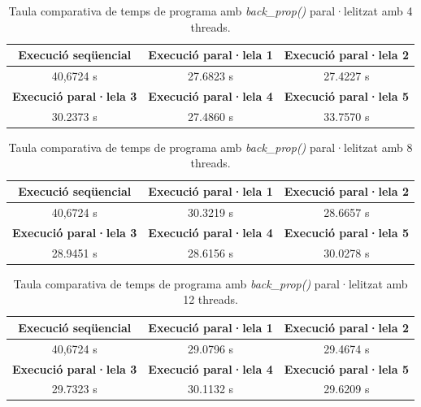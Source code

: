 \documentclass{article}
\begin{document}
\begin{table}[H]
    \centering
    \begin{tabular}{|c|c|c|}
        \hline
        \textbf{Execució seqüencial} & \textbf{Execució paral·lela 1} & \textbf{Execució paral·lela 2} \\ \hline
        40,6724 s & 27.6823 s & 27.4227 s \\ \hline
        \textbf{Execució paral·lela 3} & \textbf{Execució paral·lela 4} & \textbf{Execució paral·lela 5} \\ \hline
        30.2373 s & 27.4860 s & 33.7570 s \\ \hline
    \end{tabular}
    \caption{Taula comparativa de temps de programa amb  \textit{back\_prop()} paral·lelitzat amb 4 threads.}
    \label{tab:f5_4trheads}
\end{table}

\begin{table}[H]
    \centering
    \begin{tabular}{|c|c|c|}
        \hline
        \textbf{Execució seqüencial} & \textbf{Execució paral·lela 1} & \textbf{Execució paral·lela 2} \\ \hline
        40,6724 s & 30.3219 s & 28.6657 s \\ \hline
        \textbf{Execució paral·lela 3} & \textbf{Execució paral·lela 4} & \textbf{Execució paral·lela 5} \\ \hline
        28.9451 s & 28.6156 s & 30.0278 s \\ \hline
    \end{tabular}
    \caption{Taula comparativa de temps de programa amb \textit{back\_prop()} paral·lelitzat amb 8 threads.}
    \label{tab:f5_8trheads}
\end{table}

\begin{table}[H]
    \centering
    \begin{tabular}{|c|c|c|}
        \hline
        \textbf{Execució seqüencial} & \textbf{Execució paral·lela 1} & \textbf{Execució paral·lela 2} \\ \hline
        40,6724 s & 29.0796 s & 29.4674 s\\ \hline
        \textbf{Execució paral·lela 3} & \textbf{Execució paral·lela 4} & \textbf{Execució paral·lela 5} \\ \hline
        29.7323 s & 30.1132 s & 29.6209 s \\ \hline
    \end{tabular}
    \caption{Taula comparativa de temps de programa amb \textit{back\_prop()} paral·lelitzat amb 12 threads.}
    \label{tab:f5_12trheads}
\end{table}
\end{document}
